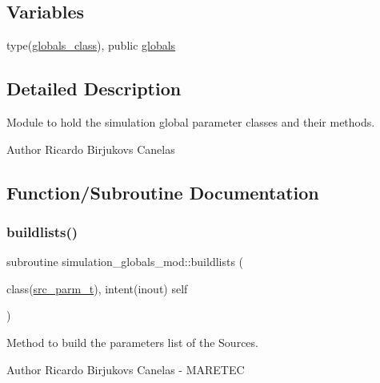 \subsection*{Variables}
\begin{DoxyCompactItemize}
\item 
type(\mbox{\hyperlink{structsimulation__globals__mod_1_1globals__class}{globals\+\_\+class}}), public \mbox{\hyperlink{namespacesimulation__globals__mod_a04123075b6de525703edb89697fc39e9}{globals}}
\end{DoxyCompactItemize}


\subsection{Detailed Description}
Module to hold the simulation global parameter classes and their methods. 

\begin{DoxyAuthor}{Author}
Ricardo Birjukovs Canelas 
\end{DoxyAuthor}


\subsection{Function/\+Subroutine Documentation}
\mbox{\label{namespacesimulation__globals__mod_a7d1e2edffaed498051342e0cd902ce1c}} 
\subsubsection{\texorpdfstring{buildlists()}{buildlists()}}
{\footnotesize\ttfamily subroutine simulation\+\_\+globals\+\_\+mod\+::buildlists (\begin{DoxyParamCaption}\item[{class(\mbox{\hyperlink{structsimulation__globals__mod_1_1src__parm__t}{src\+\_\+parm\+\_\+t}}), intent(inout)}]{self }\end{DoxyParamCaption})\hspace{0.3cm}{\ttfamily [private]}}



Method to build the parameters list of the Sources. 

\begin{DoxyAuthor}{Author}
Ricardo Birjukovs Canelas -\/ M\+A\+R\+E\+T\+EC 
\end{DoxyAuthor}


